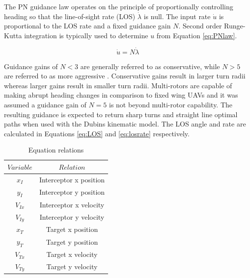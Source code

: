 \documentclass[conference]{IEEEtran}
\begin{document}
The PN guidance law operates on the principle of proportionally controlling heading so that the line-of-sight rate (LOS) $\dot{\lambda}$ is null. The input rate $\dot{u}$ is proportional to the LOS rate and a fixed guidance gain $N$. Second order Runge-Kutta integration is typically used to determine $u$ from Equation \ref{eq:PNlaw}.

\begin{equation} \label{eq:PNlaw}
\dot{u} = N\dot{\lambda}
\end{equation}


Guidance gains of $N < 3$ are generally referred to as conservative, while $N > 5$ are referred to as more aggressive \cite{zarchan}. Conservative gains result in larger turn radii whereas larger gains result in smaller turn radii. Multi-rotors are capable of making abrupt heading changes in comparison to fixed wing UAVs and it was assumed a guidance gain of $N = 5$ is not beyond multi-rotor capability. The resulting guidance is expected to return sharp turns and straight line optimal paths when used with the Dubins kinematic model. The LOS angle and rate are calculated in Equations \ref{eq:LOS} and \ref{eq:losrate} respectively. 
 
 \begin{table}
 \centering
 \caption{Equation relations}
 \begin{tabular}{cc}

 	$Variable$ & $Relation$ \\
 	\hline 
 	$x_I$  & Interceptor x position \\ 
 	
 	$y_I$ & Interceptor y position \\ 
 	
 	$V_{Ix}$ & Interceptor x velocity \\ 
 	
 	$V_{Iy}$ & Interceptor y velocity \\ 
 	
 	$x_T$ & Target x position \\ 
 	
 	$y_T$ & Target y position \\ 
 	
 	$V_{Tx}$ & Target x velocity \\ 
 	
 	$V_{Ty}$ & Target y velocity \\ 

 \end{tabular}
 \end{table}
\end{document}
